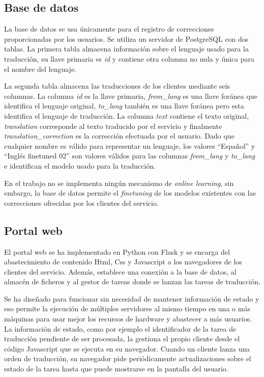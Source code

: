 \subsection{Base de datos}
La base de datos se usa únicamente para el registro de correcciones proporcionadas por los usuarios. Se utiliza un servidor de PostgreSQL con dos tablas. La primera tabla almacena información sobre el lenguaje usado para la traducción, su llave primaria es \textit{id} y contiene otra columna no nula y única para el nombre del lenguaje.

La segunda tabla almacena las traducciones de los clientes mediante seis columnas. La columna \textit{id} es la llave primaria, \textit{from\_lang} es una llave foránea que identifica el lenguaje original, \textit{to\_lang} también es una llave foránea pero esta identifica el lenguaje de traducción. La columna \textit{text} contiene el texto original, \textit{translation} corresponde al texto traducido por el servicio y finalmente \textit{translation\_correction} es la corrección efectuada por el usuario. Dado que cualquier nombre es válido para representar un lenguaje, los valores ``Español'' y ``Inglés finetuned 02'' son valores válidos para las columnas \textit{from\_lang} y \textit{to\_lang} e identifican el modelo usado para la traducción.

En el trabajo no se implementa ningún mecanismo de \textit{online learning}, sin embargo, la base de datos permite el \textit{finetuning} de los modelos existentes con las correcciones ofrecidas por los clientes del servicio.

\subsection{Portal web}
El portal web se ha implementado en Python con Flask y se encarga del abastecimiento de contenido Html, Css y Javascript a los navegadores de los clientes del servicio. Además, establece una conexión a la base de datos, al almacén de ficheros y al gestor de tareas donde se lanzan las tareas de traducción.

Se ha diseñado para funcionar sin necesidad de mantener información de estado y eso permite la ejecución de múltiples servidores al mismo tiempo en una o más máquinas para usar mejor los recursos de hardware y abastecer a más usuarios. La información de estado, como por ejemplo el identificador de la tarea de traducción pendiente de ser procesada, la gestiona el propio cliente desde el código Javascript que se ejecuta en su navegador. Cuando un cliente lanza una orden de traducción, su navegador pide periódicamente actualizaciones sobre el estado de la tarea hasta que puede mostrarse en la pantalla del usuario.

